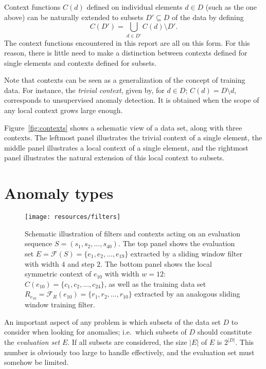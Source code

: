 Context functions $C(d)$ defined on individual elements $d \in D$ (such as the one above) can be naturally extended to subsets $D' \subseteq D$ of the data by defining
\[
    C(D') = \bigcup_{d \in D'} C(d) \setminus D'.
\]
The context functions encountered in this report are all on this form. For this reason, there is little need to make a distinction between contexts defined for single elements and contexts defined for subsets.

Note that contexts can be seen as a generalization of the concept of training data. For instance, the \emph{trivial context}, given by, for $d \in D$; $C(d) = D \setminus d$, corresponds to unsupervised anomaly detection. It is obtained when the scope of any local context grows large enough.

Figure~\ref{fig:contexts} shows a schematic view of a data set, along with three contexts. The leftmost panel illustrates the trivial context of a single element, the middle panel illustrates a local context of a single element, and the rightmost panel illustrates the natural extension of this local context to subsets.

\section{Anomaly types}
\label{sect:anomaly_types}

\begin{figure}[htb]
    \begin{center}
        \texttt{[image: resources/filters]}
    \end{center}
    \caption{{\small Schematic illustration of filters and contexts acting on an evaluation sequence $S = (s_1, s_2, \dots, s_{40})$. The top panel shows the evaluation set $E = \mathcal{F}(S) = \{e_1, e_2, \dots, e_{19}\}$ extracted by a sliding window filter with width $4$ and step $2$. The bottom panel shows the local symmetric context of $e_{10}$ with width $w = 12$: $C(e_{10}) = \{c_1, c_2, \dots, c_{24}\}$, as well as the training data set $R_{e_{10}} = \mathcal{F}_R(e_{10}) = \{r_1, r_2, \dots, r_{10}\}$ extracted by an analogous sliding window training filter.}}
\label{fig:filters}
\end{figure}

An important aspect of any problem is which subsets of the data set $D$ to consider when looking for anomalies; i.e.\ which subsets of $D$ should constitute the \emph{evaluation set} $E$. If all subsets are considered, the size $|E|$ of $E$ is $2^{|D|}$. This number is obviously too large to handle effectively, and the evaluation set must somehow be limited.

